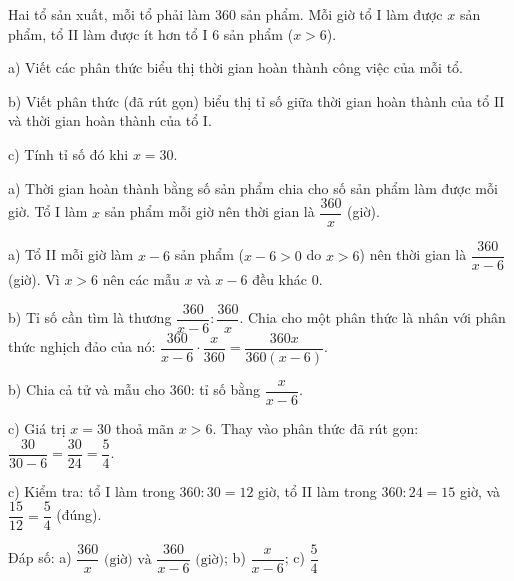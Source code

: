 \begin{problem}[8DS-PS-016]
Hai tổ sản xuất, mỗi tổ phải làm $360$ sản phẩm. Mỗi giờ tổ I làm được $x$ sản phẩm, tổ II làm được ít hơn tổ I $6$ sản phẩm ($x > 6$).

a) Viết các phân thức biểu thị thời gian hoàn thành công việc của mỗi tổ.

b) Viết phân thức (đã rút gọn) biểu thị tỉ số giữa thời gian hoàn thành của tổ II và thời gian hoàn thành của tổ I.

c) Tính tỉ số đó khi $x = 30$.

\begin{solution}
a) Thời gian hoàn thành bằng số sản phẩm chia cho số sản phẩm làm được mỗi giờ. Tổ I làm $x$ sản phẩm mỗi giờ nên thời gian là $\dfrac{360}{x}$ (giờ).

a) Tổ II mỗi giờ làm $x - 6$ sản phẩm ($x - 6 > 0$ do $x > 6$) nên thời gian là $\dfrac{360}{x - 6}$ (giờ). Vì $x > 6$ nên các mẫu $x$ và $x - 6$ đều khác $0$.

b) Tỉ số cần tìm là thương $\dfrac{360}{x - 6} : \dfrac{360}{x}$. Chia cho một phân thức là nhân với phân thức nghịch đảo của nó: $\dfrac{360}{x - 6} \cdot \dfrac{x}{360} = \dfrac{360x}{360(x - 6)}$.

b) Chia cả tử và mẫu cho $360$: tỉ số bằng $\dfrac{x}{x - 6}$.

c) Giá trị $x = 30$ thoả mãn $x > 6$. Thay vào phân thức đã rút gọn: $\dfrac{30}{30 - 6} = \dfrac{30}{24} = \dfrac{5}{4}$.

c) Kiểm tra: tổ I làm trong $360 : 30 = 12$ giờ, tổ II làm trong $360 : 24 = 15$ giờ, và $\dfrac{15}{12} = \dfrac{5}{4}$ (đúng).

Đáp số: a) $\boxed{\dfrac{360}{x} \text{ (giờ) và } \dfrac{360}{x - 6} \text{ (giờ)}}$; b) $\boxed{\dfrac{x}{x - 6}}$; c) $\boxed{\dfrac{5}{4}}$
\end{solution}
\end{problem}

